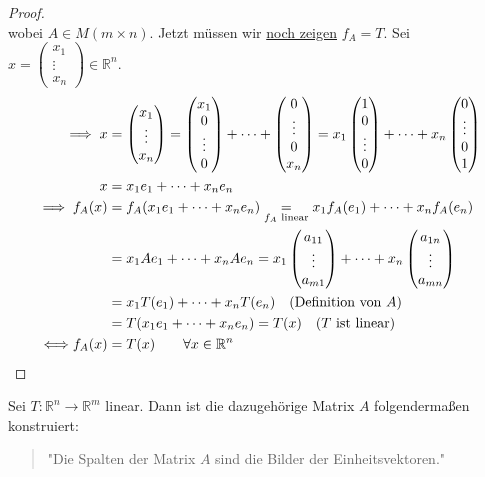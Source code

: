 \begin{proof}
\[    \]
    wobei $A\in M(m\times n)$. Jetzt müssen wir \underline{noch zeigen} $f_A = T$. Sei $x = \begin{pmatrix}
        x_1\\\vdots\\ x_n
    \end{pmatrix}\in\mathbb{R}^n$.
    \begin{align*}
        \implies x &= \begin{pmatrix}
            x_1\\\vdots\\ x_n
        \end{pmatrix} = \begin{pmatrix}
            x_1\\0\\\vdots\\0
        \end{pmatrix} + \dots + \begin{pmatrix}
            0\\\vdots\\0 \\x_n
        \end{pmatrix} = x_1 \begin{pmatrix}
            1\\0\\\vdots\\0
        \end{pmatrix} + \dots + x_n \begin{pmatrix}
            0\\\vdots\\0\\1
        \end{pmatrix}\\
        x &= x_1e_1 + \dots + x_ne_n\\
        \implies f_A(x) &= f_A(x_1e_1 + \dots + x_ne_n) \underset{f_A \text{ linear}}{=} x_1f_A(e_1) + \dots + x_nf_A(e_n)\\
        &= x_1Ae_1 + \dots + x_nAe_n = x_1 \begin{pmatrix}
            a_{11}\\\vdots\\a_{m1}
        \end{pmatrix} + \dots + x_n \begin{pmatrix}
            a_{1n}\\\vdots\\a_{mn}
        \end{pmatrix}\\
        &= x_1T(e_1) + \dots + x_nT(e_n)\quad(\text{Definition von } A)\\
        &= T(x_1e_1 + \dots + x_ne_n) = T(x)\quad (T \text{ ist linear})\\
        \Longleftrightarrow f_A(x) &= T(x)\qquad\forall x \in \mathbb{R}^n
    \end{align*}
\end{proof}
\begin{theorem}
     Sei $T:\mathbb{R}^n\to\mathbb{R}^m$ linear. Dann ist die dazugehörige Matrix
    $A$ folgendermaßen konstruiert:
    \begin{quote}
        "Die Spalten der Matrix $A$ sind die Bilder der Einheitsvektoren."
    \end{quote}
\end{theorem}